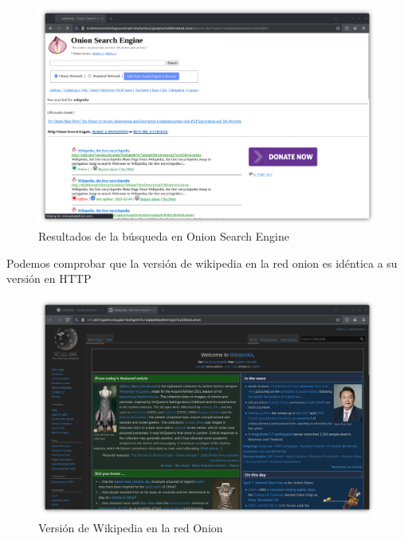 \begin{figure}[H]
    \centering
    \includegraphics[width=\textwidth]{tor-onionengine-results.png}
    \caption{Resultados de la búsqueda en Onion Search Engine}
\end{figure}

Podemos comprobar que la versión de wikipedia en la red onion es idéntica a su versión en HTTP

\begin{figure}[H]
    \centering
    \includegraphics[width=\textwidth]{tor-wikipedia.png}
    \caption{Versión de Wikipedia en la red Onion}
\end{figure}